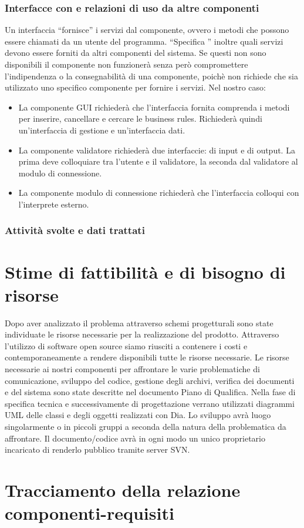 \documentclass[11pt,titlepage,a4paper]{report}
\begin{document}
\subsection{Interfacce con e relazioni di uso da altre componenti}
Un interfaccia ``fornisce'' i servizi dal componente, ovvero i metodi che possono essere chiamati da un utente del programma. ``Specifica '' inoltre quali servizi devono essere forniti da altri componenti del sistema. Se questi non sono disponibili il componente non funzioner\`a senza per\`o compromettere l'indipendenza o la consegnabilit\`a di una componente, poich\`e non richiede che sia utilizzato uno specifico componente per fornire i servizi. Nel nostro caso:
\begin{itemize}
\item La componente GUI richieder\`a che l'interfaccia fornita comprenda i metodi per inserire, cancellare e cercare le business rules. Richieder\`a quindi un'interfaccia di gestione e un'interfaccia dati.
\item La componente validatore richieder\`a due interfaccie: di input e di output. La prima deve colloquiare tra l'utente e il validatore, la seconda dal validatore al modulo di connessione.
\item La componente modulo di connessione richieder\`a che l'interfaccia colloqui con l'interprete esterno.
\end{itemize}
\subsection{Attivit\`a svolte e dati trattati}


\chapter{Stime di fattibilit\`a e di bisogno di risorse}
Dopo aver analizzato il problema attraverso schemi progetturali sono state individuate le risorse necessarie  per la realizzazione del prodotto. Attraverso l'utilizzo di software open source siamo riusciti a contenere i costi e contemporaneamente a rendere disponibili tutte le risorse necessarie.
Le risorse necessarie ai nostri componenti per affrontare le varie problematiche di comunicazione, sviluppo del codice, gestione degli archivi, verifica dei documenti e del sistema sono state descritte nel documento Piano di Qualifica. Nella fase di specifica tecnica e successivamente di progettazione verrano utilizzati diagrammi UML delle classi e degli oggetti realizzati con Dia. Lo sviluppo avr\`a luogo singolarmente o in piccoli gruppi a seconda della natura della problematica da affrontare. Il documento/codice avr\`a in ogni modo un unico proprietario incaricato di renderlo pubblico tramite server SVN.
\chapter{Tracciamento della relazione componenti-requisiti}
\end{document}
